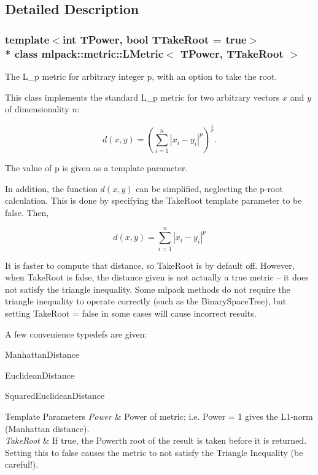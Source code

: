 \subsection{Detailed Description}
\subsubsection*{template$<$int T\+Power, bool T\+Take\+Root = true$>$\\*
class mlpack\+::metric\+::\+L\+Metric$<$ T\+Power, T\+Take\+Root $>$}

The L\+\_\+p metric for arbitrary integer p, with an option to take the root. 

This class implements the standard L\+\_\+p metric for two arbitrary vectors $ x $ and $ y $ of dimensionality $ n $\+:

\[ d(x, y) = \left( \sum_{i = 1}^{n} | x_i - y_i |^p \right)^{\frac{1}{p}}. \]

The value of p is given as a template parameter.

In addition, the function $ d(x, y) $ can be simplified, neglecting the p-\/root calculation. This is done by specifying the Take\+Root template parameter to be false. Then,

\[ d(x, y) = \sum_{i = 1}^{n} | x_i - y_i |^p \]

It is faster to compute that distance, so Take\+Root is by default off. However, when Take\+Root is false, the distance given is not actually a true metric -- it does not satisfy the triangle inequality. Some mlpack methods do not require the triangle inequality to operate correctly (such as the Binary\+Space\+Tree), but setting Take\+Root = false in some cases will cause incorrect results.

A few convenience typedefs are given\+:


\begin{DoxyItemize}
\item Manhattan\+Distance
\item Euclidean\+Distance
\item Squared\+Euclidean\+Distance
\end{DoxyItemize}


\begin{DoxyTemplParams}{Template Parameters}
{\em Power} & Power of metric; i.\+e. Power = 1 gives the L1-\/norm (Manhattan distance). \\
\hline
{\em Take\+Root} & If true, the Power\textquotesingle{}th root of the result is taken before it is returned. Setting this to false causes the metric to not satisfy the Triangle Inequality (be careful!). \\
\hline
\end{DoxyTemplParams}


